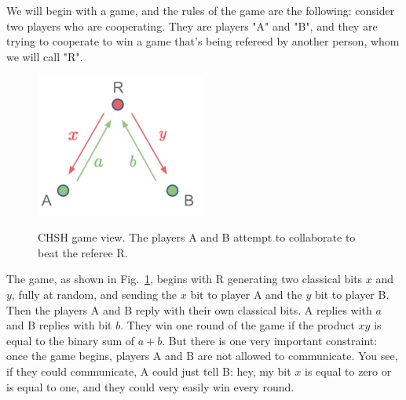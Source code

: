 We will begin with a game, and the rules of the game are the following: consider two players who are cooperating. They are players "A" and "B", and they are trying to cooperate to win a game that's being refereed by another person, whom we will call "R".

\begin{figure}[H]
    \centering
    \includegraphics[width=0.5\textwidth]{lesson4/CHSH_diagram.pdf}
    \label{fig:chsh-game}
    \begin{center}
        \caption{CHSH game view. The players A and B attempt to collaborate to beat the referee R.}
    \end{center}
\end{figure}

The game, as shown in Fig.~\ref{fig:chsh-game}, begins with R generating two classical bits $x$ and $y$, fully at random, and sending the $x$ bit to player A and the $y$ bit to player B. Then the players A and B reply with their own classical bits. A replies with $a$ and B replies with bit $b$. They win one round of the game if the product $xy$ is equal to the binary sum of $a + b$. But there is one very important constraint: once the game begins, players A and B are not allowed to communicate. You see, if they could communicate, A could just tell B: hey, my bit $x$ is equal to zero or is equal to one, and they could very easily win every round.

